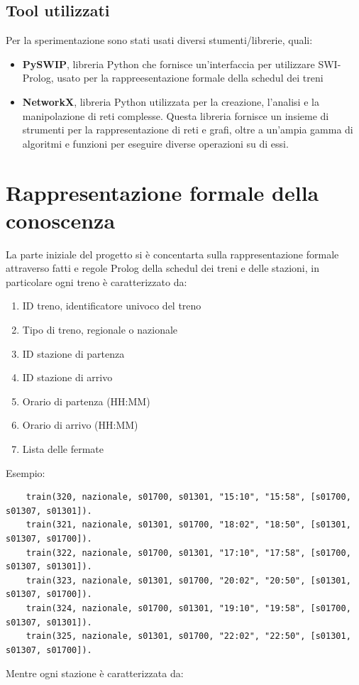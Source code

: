 \documentclass[italian,12pt,a4paper]{article}
\begin{document}
	
	\subsection{Tool utilizzati}
	Per la sperimentazione sono stati usati diversi stumenti/librerie, quali:
	
		\begin{itemize}
			\item \textbf{PySWIP}, libreria Python che fornisce un'interfaccia per utilizzare SWI-Prolog, usato per la rappreesentazione formale della schedul dei treni
			\item \textbf{NetworkX}, libreria Python utilizzata per la creazione, l'analisi e la manipolazione di reti complesse. Questa libreria fornisce un insieme di strumenti per la rappresentazione di reti e grafi, oltre a un'ampia gamma di algoritmi e funzioni per eseguire diverse operazioni su di essi.
		\end{itemize}

	\section{Rappresentazione formale della conoscenza}
	La parte iniziale del progetto si è concentarta sulla rappresentazione formale attraverso fatti e regole Prolog della schedul dei treni e delle stazioni, in particolare ogni treno è caratterizzato da:
	
		\begin{enumerate}
			\item ID treno, identificatore univoco del treno
			\item Tipo di treno, regionale o nazionale
			\item ID stazione di partenza
			\item ID stazione di arrivo
			\item Orario di partenza (HH:MM)
			\item Orario di arrivo (HH:MM)
			\item Lista delle fermate
		\end{enumerate}
		Esempio:
		
\begin{small}

\begin{verbatim}
	train(320, nazionale, s01700, s01301, "15:10", "15:58", [s01700, s01307, s01301]).
	train(321, nazionale, s01301, s01700, "18:02", "18:50", [s01301, s01307, s01700]).
	train(322, nazionale, s01700, s01301, "17:10", "17:58", [s01700, s01307, s01301]).
	train(323, nazionale, s01301, s01700, "20:02", "20:50", [s01301, s01307, s01700]).
	train(324, nazionale, s01700, s01301, "19:10", "19:58", [s01700, s01307, s01301]).
	train(325, nazionale, s01301, s01700, "22:02", "22:50", [s01301, s01307, s01700]).
\end{verbatim}
\end{small}
	Mentre ogni stazione è caratterizzata da:
	
\end{document}

